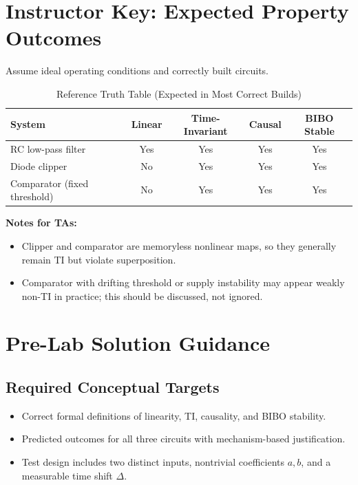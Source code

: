 \documentclass[11pt,letterpaper]{article}
\begin{document}
\section{Instructor Key: Expected Property Outcomes}

Assume ideal operating conditions and correctly built circuits.

\begin{table}[h!]
\centering
\caption{Reference Truth Table (Expected in Most Correct Builds)}
\begin{tabular}{lcccc}
\toprule
System & Linear & Time-Invariant & Causal & BIBO Stable \\
\midrule
RC low-pass filter & Yes & Yes & Yes & Yes \\
Diode clipper & No & Yes & Yes & Yes \\
Comparator (fixed threshold) & No & Yes & Yes & Yes \\
\bottomrule
\end{tabular}
\end{table}

\textbf{Notes for TAs:}
\begin{itemize}[leftmargin=1.2em]
    \item Clipper and comparator are memoryless nonlinear maps, so they generally remain TI but violate superposition.
    \item Comparator with drifting threshold or supply instability may appear weakly non-TI in practice; this should be discussed, not ignored.
\end{itemize}

\section{Pre-Lab Solution Guidance}

\subsection*{Required Conceptual Targets}
\begin{itemize}[leftmargin=1.2em]
    \item Correct formal definitions of linearity, TI, causality, and BIBO stability.
    \item Predicted outcomes for all three circuits with mechanism-based justification.
    \item Test design includes two distinct inputs, nontrivial coefficients $a,b$, and a measurable time shift $\Delta$.
\end{itemize}
\end{document}
